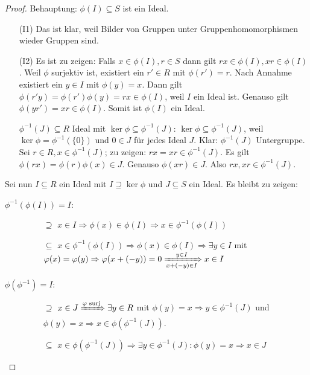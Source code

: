 \documentclass[12pt,a4paper]{scrartcl}
\begin{document}
\begin{proof}
	Behauptung: $\phi(I)\subseteq S$ ist ein Ideal.
	\begin{itemize}
		\item[(I1)] Das ist klar, weil Bilder von Gruppen unter Gruppenhomomorphismen wieder Gruppen sind.
		\item[(I2)] Es ist zu zeigen: Falls $x\in \phi(I) , r\in S$ dann gilt $ rx\in \phi(I), xr\in \phi(I)$. Weil $\phi$ surjektiv ist, existiert ein $r'\in R$ mit $\phi(r') = r$. Nach Annahme existiert ein $y \in I$ mit $\phi(y) = x$. Dann gilt $\phi(r'y) = \phi (r')\phi(y)  = rx\in \phi(I)$, weil  $I$ ein Ideal ist. Genauso gilt $\phi(yr') = xr\in\phi(I)$. Somit ist $\phi(I)$ ein Ideal.

		$\phi^{-1}(J)\subseteq R$ Ideal mit $\ker\phi\subseteq \phi^{-1}(J)$: $\ker\phi\subseteq \phi^{-1}(J)$, weil $\ker\phi = \phi^{-1}(\{0\})$ und $0\in J$ für jedes Ideal $J$. Klar: $\phi^{-1}(J)$ Untergruppe. Sei $r\in R, x\in\phi^{-1}(J)$; zu zeigen: $rx = xr\in\phi^{-1}(J)$. Es gilt $\phi(rx) = \phi(r)\phi(x)\in J$. Genauso $\phi(xr)\in J$. Also $rx,xr\in\phi^{-1}(J)$.
	\end{itemize}

	Sei nun $I \subseteq R$ ein Ideal mit $I \supseteq \ker\phi$ und $J \subseteq S$ ein Ideal. Es bleibt zu zeigen:
	\begin{description}
		\item[$\phi^{-1}(\phi(I)) = I$:] \leavevmode
		\begin{itemize}
			\item[\glqq $\supseteq$\grqq] $x\in I \Rightarrow \phi(x) \in \phi(I)\Rightarrow x\in \phi^{-1}(\phi(I))$
			\item[\glqq $\subseteq$\grqq] $x\in \phi^{-1}(\phi(I)) \Rightarrow \phi(x)\in \phi(I)\Rightarrow \exists y\in I$ mit $\phi(x) = \phi(y)\Rightarrow \phi(x+(-y)) = 0\xRightarrow[x+(-y)\in I]{y\in I} x\in I$
		\end{itemize}
		\item[$\phi(\phi^{-1}) = I$:] \leavevmode
		\begin{itemize}
			\item[\glqq $\supseteq$\grqq] $x\in J \xRightarrow{\phi\text{ surj}}\exists y\in R$ mit $\phi(y) = x\Rightarrow y\in\phi^{-1}(J)$ und $\phi(y) = x\Rightarrow x\in\phi(\phi^{-1}(J))$.
			\item[\glqq$\subseteq$\grqq] $x\in\phi(\phi^{-1}(J))\Rightarrow \exists y\in\phi^{-1}(J): \phi(y) = x\Rightarrow x\in J$
		\end{itemize}
	\end{description}
\end{proof}
\end{document}
